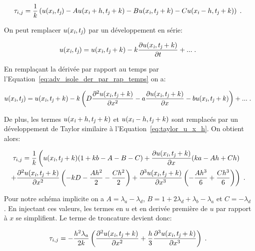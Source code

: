 \documentclass[a4paper, 12pt]{report}
\begin{document}
\begin{equation}
\tau_{i,j} = \frac{1}{k} \left ( u(x_{\textsl{i}}, t_{\textsl{j}}) - A u(x_{\textsl{i}}+h, t_{\textsl{j}}+k) - B u(x_{\textsl{i}}, t_{\textsl{j}}+k) - C u(x_{\textsl{i}}-h, t_{\textsl{j}}+k) \right ) \;.
\end{equation}

On peut remplacer $u(x_{\textsl{i}}, t_{\textsl{j}})$ par un développement en série:

\begin{equation}
  u(x_{\textsl{i}}, t_{\textsl{j}}) = u(x_{\textsl{i}}, t_{\textsl{j}}+k)
  -k \frac{\partial u(x_{\textsl{i}}, t_{\textsl{j}}+k)}{\partial t} + ...\;.
\end{equation}

En remplaçant la dérivée par rapport au temps par l'Equation~\ref{eq:adv_isole_der_par_rap_temps} on a:

\begin{equation}
  u(x_{\textsl{i}}, t_{\textsl{j}}) = u(x_{\textsl{i}}, t_{\textsl{j}}+k)
  -k \left ( D \frac{\partial^2 u(x_{\textsl{i}}, t_{\textsl{j}}+k)}{\partial x^2} - a \frac{\partial u(x_{\textsl{i}}, t_{\textsl{j}}+k)}{\partial x} -b u(x_{\textsl{i}}, t_{\textsl{j}}+k) \right ) + ...\;.
\end{equation}

De plus, les termes $u(x_{\textsl{i}}+h, t_{\textsl{j}}+k)$ et $u(x_{\textsl{i}}-h, t_{\textsl{j}}+k)$
sont remplacés par un développement de Taylor similaire à l'Equation~\ref{eq:taylor_u_x_h}.
On obtient alors:

\begin{multline}
  \tau_{i,j} = \frac{1}{k} \left (u(x_{\textsl{i}}, t_{\textsl{j}}+k) (1+kb-A-B-C) + \frac{\partial u(x_{\textsl{i}}, t_{\textsl{j}}+k)}{\partial x}  ( ka -Ah +Ch ) \right. \\
  \left. + \frac{\partial^2 u(x_{\textsl{i}}, t_{\textsl{j}}+k)}{\partial x^2} \left (-kD - \frac{A h^2}{2} - \frac{Ch^2}{2} \right ) + \frac{\partial^3 u(x_{\textsl{i}}, t_{\textsl{j}}+k)}{\partial x^3}  \left (-\frac{A h^3}{6} + \frac{Ch^3}{6} \right ) \right )\;.
\end{multline}

Pour notre schéma implicite on a $A = \lambda_a - \lambda_d$, $B = 1+2\lambda_d + \lambda_b-\lambda_a$ et $C=-\lambda_d$.
En injectant ces valeurs, les termes en $u$ et en derivée première de $u$ par rapport
à $x$ se simplifient. Le terme de troncature devient donc:

\begin{equation}
  \tau_{i,j} = -\frac{h^2 \lambda_a}{2k} \left (\frac{\partial^2 u(x_{\textsl{i}}, t_{\textsl{j}}+k)}{\partial x^2} + \frac{h}{3} \frac{\partial^3 u(x_{\textsl{i}}, t_{\textsl{j}}+k)}{\partial x^3}  \right )\;.
\end{equation}
\end{document}
